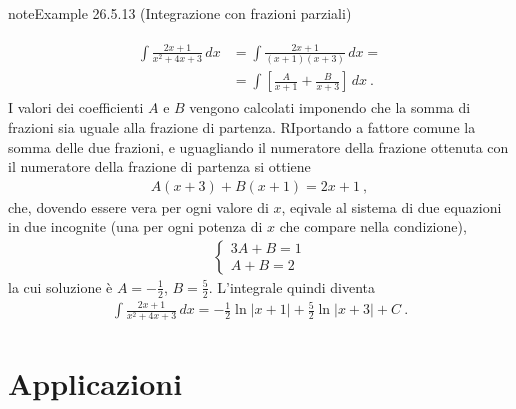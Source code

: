 \documentclass[letterpaper,10pt,italian]{jupyterBook}
\begin{document}
\begin{sphinxadmonition}{note}{Example 26.5.13 (Integrazione con frazioni parziali)}


\begin{equation*}
\begin{split}\begin{aligned}
  \int \frac{2x + 1}{x^2 + 4x + 3} \, dx 
  & = \int \frac{2x + 1}{(x+1)(x+3)} \, dx= \\
  & = \int \left[ \frac{A}{x+1} + \frac{B}{x+3} \right] \, dx \ .
\end{aligned}\end{split}
\end{equation*}
\sphinxAtStartPar
I valori dei coefficienti \(A\) e \(B\) vengono calcolati imponendo che la somma di frazioni sia uguale alla frazione di partenza. RIportando a fattore comune la somma delle due frazioni, e uguagliando il numeratore della frazione ottenuta con il numeratore della frazione di partenza si ottiene
\begin{equation*}
\begin{split}A (x+3) + B(x+1) = 2x + 1 \ ,\end{split}
\end{equation*}
\sphinxAtStartPar
che, dovendo essere vera per ogni valore di \(x\), eqivale al sistema di due equazioni in due incognite (una per ogni potenza di \(x\) che compare nella condizione),
\begin{equation*}
\begin{split}\begin{cases}
  3 A + B = 1 \\
  A + B = 2
\end{cases}\end{split}
\end{equation*}
\sphinxAtStartPar
la cui soluzione è \(A = -\frac{1}{2}\), \(B = \frac{5}{2}\). L’integrale quindi diventa
\begin{equation*}
\begin{split}\int \frac{2x + 1}{x^2 + 4x + 3} \, dx= -\frac{1}{2} \ln |x+1| + \frac{5}{2} \ln |x + 3| + C \ .\end{split}
\end{equation*}\end{sphinxadmonition}


\section{Applicazioni}
\label{\detokenize{ch/infinitesimal_calculus/integrals:applicazioni}}\label{\detokenize{ch/infinitesimal_calculus/integrals:infinitesimal-calculus-integrals-applications}}
\end{document}
